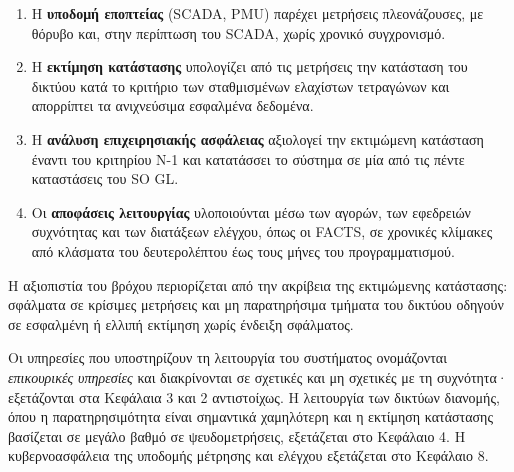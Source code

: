 \begin{enumerate}
\item Η \textbf{υποδομή εποπτείας} (SCADA, PMU) παρέχει μετρήσεις πλεονάζουσες, με θόρυβο
      και, στην περίπτωση του SCADA, χωρίς χρονικό συγχρονισμό.
\item Η \textbf{εκτίμηση κατάστασης} υπολογίζει από τις μετρήσεις την κατάσταση του δικτύου
      κατά το κριτήριο των σταθμισμένων ελαχίστων τετραγώνων και απορρίπτει τα ανιχνεύσιμα
      εσφαλμένα δεδομένα.
\item Η \textbf{ανάλυση επιχειρησιακής ασφάλειας} αξιολογεί την εκτιμώμενη κατάσταση έναντι
      του κριτηρίου N-1 και κατατάσσει το σύστημα σε μία από τις πέντε καταστάσεις του
      SO GL.
\item Οι \textbf{αποφάσεις λειτουργίας} υλοποιούνται μέσω των αγορών, των εφεδρειών
      συχνότητας και των διατάξεων ελέγχου, όπως οι FACTS, σε χρονικές κλίμακες από κλάσματα
      του δευτερολέπτου έως τους μήνες του προγραμματισμού.
\end{enumerate}

Η αξιοπιστία του βρόχου περιορίζεται από την ακρίβεια της εκτιμώμενης κατάστασης: σφάλματα
σε κρίσιμες μετρήσεις και μη παρατηρήσιμα τμήματα του δικτύου οδηγούν σε εσφαλμένη ή ελλιπή
εκτίμηση χωρίς ένδειξη σφάλματος.

Οι υπηρεσίες που υποστηρίζουν τη λειτουργία του συστήματος ονομάζονται \emph{επικουρικές
υπηρεσίες} και διακρίνονται σε σχετικές και μη σχετικές με τη συχνότητα· εξετάζονται στα
Κεφάλαια 3 και 2 αντιστοίχως. Η λειτουργία των δικτύων διανομής, όπου η παρατηρησιμότητα
είναι σημαντικά χαμηλότερη και η εκτίμηση κατάστασης βασίζεται σε μεγάλο βαθμό σε
ψευδομετρήσεις, εξετάζεται στο Κεφάλαιο 4. Η κυβερνοασφάλεια της υποδομής μέτρησης και
ελέγχου εξετάζεται στο Κεφάλαιο 8.

